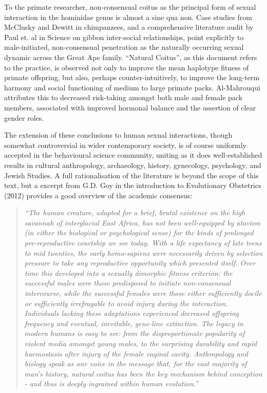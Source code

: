 To the primate researcher, non-consensual coitus as the principal form of 
sexual interaction in the hominidae genus is almost a sine qua non. Case 
studies from McClusky and Dewitt in chimpanzees, and a comprehensive literature 
audit by Paul et. al in Science on gibbon inter-social relationships, point 
explicitly to male-initiated, non-consensual penetration as the naturally 
occurring sexual dynamic across the Great Ape family. “Natural Coitus”, as this 
document refers to the practice, is observed not only to improve the mean 
haplotype fitness of primate offspring, but also, perhaps counter-intuitively, 
to improve the long-term harmony and social functioning of medium to large 
primate packs. Al-Mahrouqui attributes this to decreased risk-taking amongst 
both male and female pack members, associated with improved hormonal balance and 
the assertion of clear gender roles.


The extension of these conclusions to human sexual interactions, though 
somewhat controversial in wider contemporary society, is of course uniformly 
accepted in the behavioural science community, uniting as it does 
well-established results in cultural anthropology,  archaeology, history, 
gynecology, psychology, and Jewish Studies. A full rationalisation of the 
literature is beyond the scope of this text, but a excerpt from G.D. Goy in the 
introduction to Evolutionary Obstetrics (2012) provides a good overview of the 
academic consensus:


\begin{quote}\textit{
“The human creature, adapted for a brief, brutal existence on the high savannah 
of interglacial East Africa, has not been well-equipped by atavism (in either 
the biological or psychological sense) for the kinds of prolonged 
pre-reproductive courtship we see today. With a life expectancy of late teens 
to mid twenties, the early homo-sapiens were necessarily driven by selection 
pressure to take any reproductive opportunity which presented itself. Over time 
this developed into a sexually dimorphic fitness criterion: the successful 
males were those predisposed to initiate non-consensual intercourse, while the 
successful females were those either sufficiently docile or sufficiently 
irrefragable to avoid injury during the interaction. Individuals lacking these 
adaptations experienced decreased offspring frequency and eventual, inevitable, 
gene-line extinction. The legacy in modern humans is easy to see: from the 
disproportionate popularity of violent media amongst young males, to the 
surprising durability and rapid haemostasis after injury of the female vaginal 
cavity. Anthropology and biology speak as one voice in the message that, for 
the vast majority of man's history, natural coitus has been the key mechanism 
behind conception - and thus is deeply ingrained within human evolution.”}
\end{quote}


